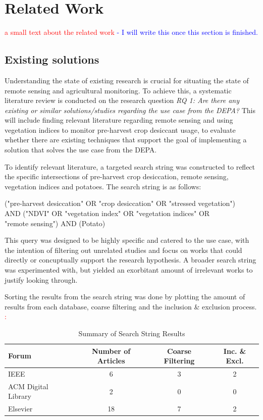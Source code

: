 \chapter{Related Work} \label{Related Work}
\textcolor{red}{a small text about the related work}
\textcolor{blue}{ - I will write this once this section is finished.}

\section{Existing solutions}
Understanding the state of existing research is crucial for situating the state of remote sensing and agricultural monitoring. To achieve this, a systematic literature review is conducted on the research question
\textit{RQ 1: Are there any existing or similar solutions/studies regarding the use case from the \acrshort{DEPA}?}
This will include finding relevant literature regarding remote sensing and using vegetation indices to monitor pre-harvest crop desiccant usage, to evaluate whether there are existing techniques that support the goal of implementing a solution that solves the use case from the \acrshort{DEPA}.

To identify relevant literature, a targeted search string was constructed to reflect the specific intersections of pre-harvest crop desiccation, remote sensing, vegetation indices and potatoes.
The search string is as follows:

\begin{table}[h]
    \centering
        ("pre-harvest desiccation" OR "crop desiccation" OR "stressed vegetation") 
        \\AND ("NDVI" OR "vegetation index" OR "vegetation indices" OR 
        \\"remote sensing") AND (Potato)
    \label{tab:my_label}
\end{table}

This query was designed to be highly specific and catered to the use case, with the intention of filtering out unrelated studies and focus on works that could directly or concuptually support the research hypothesis. A broader search string was experimented with, but yielded an exorbitant amount of irrelevant works to justify looking through.

Sorting the results from the search string was done by plotting the amount of results from each database, coarse filtering and the inclusion \& exclusion process.
\textcolor{red}{:}
\begin{table}[H]
    \centering
    \begin{tabular}{|l|c|c|c|}
    \hline
    \textbf{Forum} & \textbf{Number of Articles} & \textbf{Coarse Filtering} & \textbf{Inc. \& Excl.} \\ \hline
    IEEE & 6 & 3 & 2 \\ \hline
    ACM Digital Library & 2 & 0 & 0 \\ \hline
    Elsevier & 18 & 7 & 2 \\ \hline
    \end{tabular}
    \caption{Summary of Search String Results}
    \label{tab:forum_summary}
\end{table}

